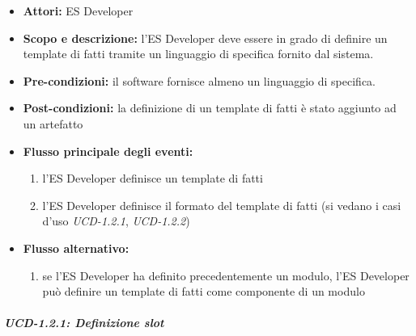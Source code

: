 \begin{itemize}
	\item \textbf{Attori:} ES Developer
	\item \textbf{Scopo e descrizione:} l'ES Developer deve essere in grado di definire un template di fatti tramite un linguaggio di specifica fornito dal sistema.
	\item \textbf{Pre-condizioni:} il software fornisce almeno un linguaggio di specifica.
	\item \textbf{Post-condizioni:} la definizione di un template di fatti è stato aggiunto ad un artefatto
	\item \textbf{Flusso principale degli eventi:}
		\begin{enumerate}
			\item l'ES Developer definisce un template di fatti
			\item l'ES Developer definisce il formato del template di fatti (si vedano i casi d'uso \emph{UCD-1.2.1}, \emph{UCD-1.2.2})
		\end{enumerate}
	\item \textbf{Flusso alternativo:} 
		\begin{enumerate}
			\item se l'ES Developer ha definito precedentemente un modulo, l'ES Developer può definire un template di fatti come componente di un modulo
		\end{enumerate}
\end{itemize}

\subparagraph{UCD-1.2.1: Definizione slot}


